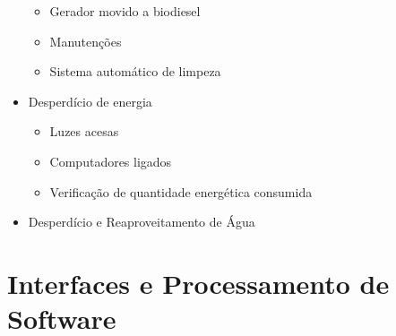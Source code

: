 \begin{apendicesenv}
\begin{itemize}
\begin{itemize}
        \item Gerador movido a biodiesel
      \item Manutenções
      \item Sistema automático de limpeza
    \end{itemize}

    \item Desperdício de energia
      \begin{itemize}
        \item Luzes acesas
        \item Computadores ligados
        \item Verificação de quantidade energética consumida
      \end{itemize}
    \item Desperdício e Reaproveitamento de Água
  \end{itemize}

\section{Interfaces e Processamento de Software}


\end{apendicesenv}
